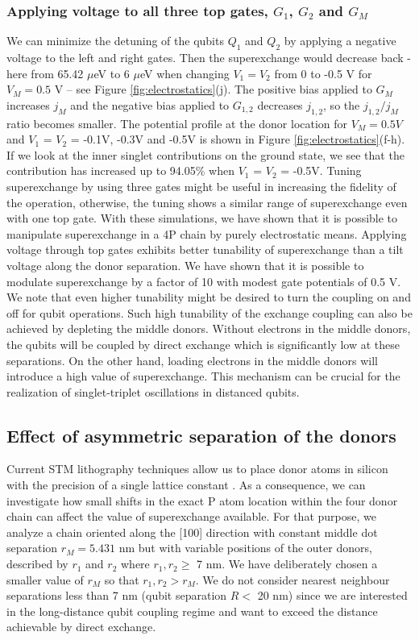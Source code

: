 \documentclass[%
showkeys,
 amsmath,amssymb,
 aps,
prb,
]{revtex4-2}
\begin{document}
\subsubsection{Applying voltage to all three top gates, $G_1$, $G_2$ and $G_M$}
We can minimize the detuning of the qubits $Q_1$ and $Q_2$ by applying a negative voltage to the left and right gates. Then the superexchange would decrease back - here from 65.42 $\mu$eV to 6 $\mu$eV when changing $V_1=V_2$ from 0 to -0.5 V for $V_M=0.5$ V -- see Figure \ref{fig:electrostatics}(j). The positive bias applied to $G_M$ increases $j_M$ and the negative bias applied to $G_{1,2}$ decreases $j_{1,2}$, so the $j_{1,2}/j_M$ ratio becomes smaller. The potential profile at the donor location for $V_M = 0.5V$ and $V_1$ = $V_2$ = -0.1V, -0.3V and -0.5V is shown in Figure \ref{fig:electrostatics}(f-h). If we look at the inner singlet contributions on the ground state, we see that the contribution has increased up to 94.05\% when $V_1$ = $V_2$ = -0.5V. Tuning superexchange by using three gates might be useful in increasing the fidelity of the operation, otherwise, the tuning shows a similar range of superexchange even with one top gate.  
With these simulations, we have shown that it is possible to manipulate superexchange in a 4P chain by purely electrostatic means. Applying voltage through top gates exhibits better tunability of superexchange than a tilt voltage along the donor separation. We have shown that it is possible to modulate superexchange by a factor of 10 with modest gate potentials of 0.5 V. We note that even higher tunability might be desired to turn the coupling on and off for qubit operations. Such high tunability of the exchange coupling can also be achieved by depleting the middle donors. Without electrons in the middle donors, the qubits will be coupled by direct exchange which is significantly low at these separations. On the other hand, loading electrons in the middle donors will introduce a high value of superexchange. This mechanism can be crucial for the realization of singlet-triplet oscillations in distanced qubits. 

\subsection{Effect of asymmetric separation of the donors}
Current STM lithography techniques allow us to place donor atoms in silicon with the precision of a single lattice constant \cite{fuechsle2012single,PhysRevApplied.16.054037,bussmann2021atomic,Simmons2022,wyrick_enhanced_2022}. As a consequence, we can investigate how small shifts in the exact P atom location within the four donor chain can affect the value of superexchange available. For that purpose, we analyze a chain oriented along the [100] direction with constant middle dot separation $r_M=5.431$ nm but with variable positions of the outer donors, described by $r_1$ and $r_2$ where $r_1,r_2 \geq$ 7 nm. We have deliberately chosen a smaller value of $r_M$ so that $r_1,r_2 > r_M$. We do not consider nearest neighbour separations less than 7 nm (qubit separation $R<$ 20 nm) since we are interested in the long-distance qubit coupling regime and want to exceed the distance achievable by direct exchange. 
\end{document}
